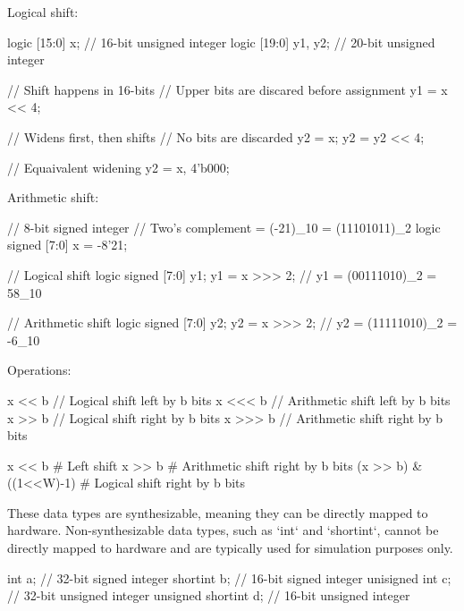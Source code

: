 \documentclass[11pt]{article}
\begin{document}
Logical shift:
\begin{systemverilogcode}
  logic [15:0] x;   // 16-bit unsigned integer
  logic [19:0] y1, y2;   // 20-bit unsigned integer

  // Shift happens in 16-bits
  // Upper bits are discared before assignment
  y1 = x << 4; 

  // Widens first, then shifts
  // No bits are discarded
  y2 = x;
  y2 = y2 << 4;

  // Equaivalent widening
  y2 = {x, 4'b000};
\end{systemverilogcode}


Arithmetic shift:

\begin{systemverilogcode}

  // 8-bit signed integer 
  // Two's complement = (-21)_{10} = (11101011)_2
  logic signed [7:0] x = -8'21;  

  // Logical shift
  logic signed [7:0] y1;
  y1 = x >>> 2; // y1 = (00111010)_2 = 58_{10}

  // Arithmetic shift
  logic signed [7:0] y2;
  y2 = x >>> 2; // y2 = (11111010)_2 = -6_{10}
\end{systemverilogcode}

Operations:

\begin{systemverilogcode}
  x << b    // Logical shift left by b bits
  x <<< b   // Arithmetic shift left by b bits
  x >> b    // Logical shift right by b bits
  x >>> b   // Arithmetic shift right by b bits
\end{systemverilogcode}


\begin{pythoncode}
  x << b    # Left shift
  x >> b    # Arithmetic shift right by b bits
  (x >> b) & ((1<<W)-1)   # Logical  shift right by b bits
\end{pythoncode}

  


These data types are synthesizable, meaning they can be directly mapped to hardware.
Non-synthesizable data types, such as `int` and `shortint`, cannot be directly mapped to hardware and are typically used for simulation purposes only.

\begin{systemverilogcode}
  int a; // 32-bit signed integer
  shortint b; // 16-bit signed integer
  unisigned int c; // 32-bit unsigned integer
  unsigned shortint d; // 16-bit unsigned integer

\end{systemverilogcode}
\end{document}
